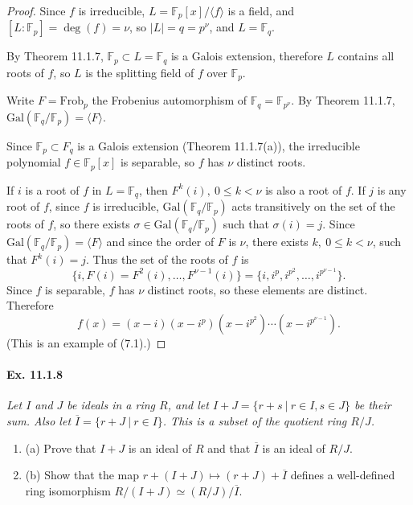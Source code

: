 \documentclass[11pt,a4paper]{article}
\newcommand{\be} {\begin{enumerate}}
\newcommand{\ee} {\end{enumerate}}
\newcommand{\F}{\mathbb{F}}
\newcommand{\Gal}{\mathrm{Gal}}
\begin{document}
\begin{proof}
 Since $f$ is irreducible, $L = \F_p[x] / \langle f \rangle$ is a field, and $[L : \F_p] = \deg(f) = \nu$, so $\vert L \vert = q= p^\nu$, and $L = \F_{q}$. 
 
 By Theorem 11.1.7, $ \F_p \subset L = \F_{q}$ is a Galois extension, therefore $L$ contains all roots of $f$, so $L$ is the splitting field of $f$ over $\F_p$.


Write $F = \mathrm{Frob}_p$ the Frobenius automorphism of $\F_q=  \F_{p^\nu}$. By Theorem 11.1.7,  $\Gal(\F_q/\F_p) = \langle F \rangle$.

Since $\F_p \subset F_q$ is a Galois extension (Theorem 11.1.7(a)), the irreducible polynomial $f \in \F_p[x]$ is separable, so $f$ has $\nu$ distinct roots.

If $i$ is a root of $f$ in $L = \F_q$, then $F^k(i),\ 0 \leq k < \nu$ is also a root of $f$. If $j$ is any root of $f$, since $f$ is irreducible, $\Gal(\F_q/\F_p) $ acts transitively on the set of the roots of $f$, so  there exists $\sigma \in \Gal(\F_q/\F_p)$ such that $\sigma(i) = j$. Since $\Gal(\F_q/\F_p) = \langle F \rangle$ and since the order of $F$ is $\nu$, there exists $k, \ 0\leq k < \nu$, such that $F^k(i) = j$. Thus the set of the roots of $f$ is
$$\{i,F(i)=F^2(i), \ldots, F^{\nu -1}(i)\} = \{i,i^p,i^{p^2},\ldots,i^{p^{\nu - 1}}\}.$$
Since $f$ is separable, $f$ has $\nu$ distinct roots, so these elements are distinct. Therefore
$$f(x) = (x-i)(x-i^p)(x - i^{p^2})\cdots(x- i^{p^{\nu - 1}}).$$
(This is an example of (7.1).)
\end{proof}

\paragraph{Ex. 11.1.8}

{\it Let $I$ and $J$ be ideals in a ring $R$, and let $I+J = \{r+s\ | \ r\in I, s\in J\}$ be their sum. Also let $\overline{I} = \{r+ J\ | \ r \in I\}$. This is a subset of the quotient ring $R/J$.
\be
\item[(a)] Prove that $I+J$ is an ideal of $R$ and that $\overline{I}$ is an ideal of $R/J$.
\item[(b)] Show that the map $r+(I+J) \mapsto (r+J) + \overline{I}$ defines a well-defined ring isomorphism $R/(I+J) \simeq (R/J)/\overline{I}$.
\ee
}
\end{document}
